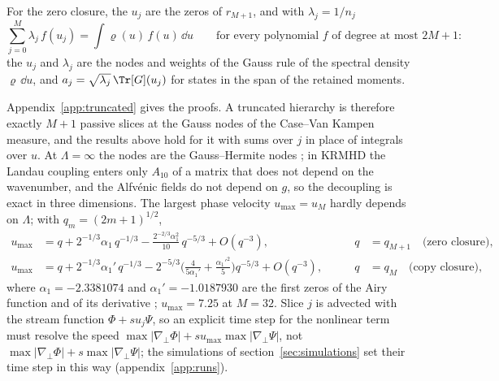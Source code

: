 \begin{proposition}\label{tr:gaussprop}
For the zero closure, the $u_j$ are the zeros of $r_{M+1}$, and with $\lambda_j=1/n_j$
\begin{equation}\label{eq:gauss}
  \sum_{j=0}^M\lambda_j\,f(u_j)=\int\varrho(u)\,f(u)\,\dd u\qquad\text{for every polynomial $f$ of degree at most $2M+1$:}
\end{equation}
the $u_j$ and $\lambda_j$ are the nodes and weights of the Gauss rule of the spectral density $\varrho\,\dd u$, and $a_j=\sqrt{\lambda_j}\,\Tr[G](u_j)$ for states in the span of the retained moments.
\end{proposition}

Appendix~\ref{app:truncated} gives the proofs. A truncated hierarchy is therefore exactly $M+1$ passive slices at the Gauss nodes of the Case--Van Kampen measure, and the results above hold for it with sums over $j$ in place of integrals over $u$. At $\Lambda=\infty$ the nodes are the Gauss--Hermite nodes \citep{ParkerDellar2015,Tassi2022}; in KRMHD the Landau coupling enters only $A_{10}$ of a matrix that does not depend on the wavenumber, and the Alfv\'enic fields do not depend on $g$, so the decoupling is exact in three dimensions. The largest phase velocity $u_{\max}=u_M$ hardly depends on $\Lambda$; with $q_m=(2m+1)^{1/2}$,
\begin{equation}\label{eq:umax}
\begin{aligned}
  u_{\max}&=q+2^{-1/3}\alpha_1\,q^{-1/3}-\frac{2^{-2/3}\alpha_1^2}{10}\,q^{-5/3}+O(q^{-3}),&\qquad q&=q_{M+1}\quad\text{(zero closure)},\\
  u_{\max}&=q+2^{-1/3}\alpha_1'\,q^{-1/3}-2^{-5/3}\Big(\frac{4}{5\alpha_1'}+\frac{\alpha_1'^2}{5}\Big)q^{-5/3}+O(q^{-3}),&\qquad q&=q_M\quad\text{(copy closure)},
\end{aligned}
\end{equation}
where $\alpha_1=-2.3381074$ and $\alpha_1'=-1.0187930$ are the first zeros of the Airy function and of its derivative \citep[theorem~6.32]{Szego1975,Olver1959}; $u_{\max}=7.25$ at $M=32$. Slice $j$ is advected with the stream function $\Phi+su_j\Psi$, so an explicit time step for the nonlinear term must resolve the speed $\max|\nabla_\perp\Phi|+su_{\max}\max|\nabla_\perp\Psi|$, not $\max|\nabla_\perp\Phi|+s\max|\nabla_\perp\Psi|$; the simulations of section~\ref{sec:simulations} set their time step in this way (appendix~\ref{app:runs}).
